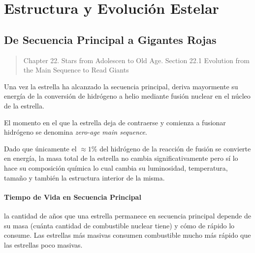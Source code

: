 \documentclass{tufte-handout}
\begin{document}
\clearpage

\section{Estructura y Evolución Estelar}

\subsection{De Secuencia Principal a Gigantes Rojas}

\begin{quotation}
  Chapter 22. Stars from Adolescen to Old Age. Section 22.1 Evolution from the Main Sequence to Read Giants
\end{quotation}


Una vez la estrella ha alcanzado la secuencia principal, deriva mayormente su energía de la conversión de hidrógeno a helio mediante fusión nuclear en el núcleo de la estrella.

El momento en el que la estrella deja de contraerse y comienza a fusionar hidrógeno se denomina \emph{zero-age main sequence}.


Dado que únicamente el $\approx 1\%$ del hidrógeno de la reacción de fusión se convierte en energía, la masa total de la estrella no cambia significativamente pero sí lo hace su composición química lo cual cambia su luminosidad, temperatura, tamaño y también la estructura interior de la misma.


\paragraph{Tiempo de Vida en Secuencia Principal} la cantidad de años que una estrella permanece en secuencia principal depende de su masa (cuánta cantidad de combustible nuclear tiene) y cómo de rápido lo consume. Las estrellas más masivas consumen combustible mucho más rápido que las estrellas poco masivas.
\end{document}
